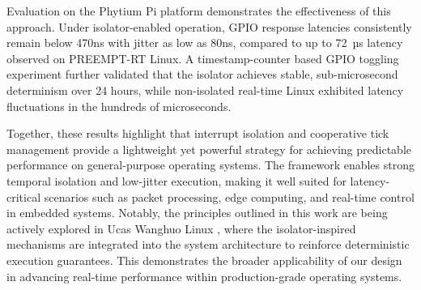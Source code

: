 \documentclass[letterpaper]{article}
\begin{document}
Evaluation on the Phytium Pi platform demonstrates the effectiveness of this approach. Under isolator-enabled operation, GPIO response latencies consistently remain below 470ns with jitter as low as 80ns, compared to up to 72~µs latency observed on PREEMPT-RT Linux. A timestamp-counter based GPIO toggling experiment further validated that the isolator achieves stable, sub-microsecond determinism over 24 hours, while non-isolated real-time Linux exhibited latency fluctuations in the hundreds of microseconds.

Together, these results highlight that interrupt isolation and cooperative tick management provide a lightweight yet powerful strategy for achieving predictable performance on general-purpose operating systems. The framework enables strong temporal isolation and low-jitter execution, making it well suited for latency-critical scenarios such as packet processing, edge computing, and real-time control in embedded systems. Notably, the principles outlined in this work are being actively explored in Ucas Wanghuo Linux \cite{zhou2025linux}, where the isolator-inspired mechanisms are integrated into the system architecture to reinforce deterministic execution guarantees. This demonstrates the broader applicability of our design in advancing real-time performance within production-grade operating systems.

\newpage
 



% 
\end{document}
